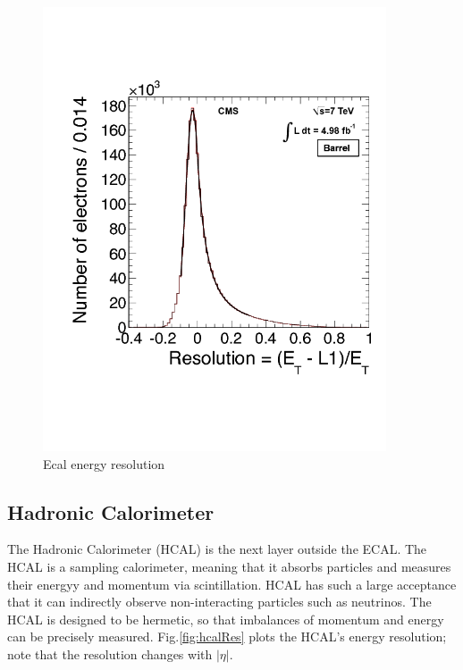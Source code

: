 \begin{figure}[h!]
\begin{centering}
\includegraphics[width=4in]{Chapter3/importfigs/figures_L1EGresolutionEB_cmsTriggerSys.png}
\par\end{centering}
\caption{Ecal energy resolution \label{fig:ecalResL1}}
\end{figure}
 
 
\subsection{Hadronic Calorimeter}


The Hadronic Calorimeter (HCAL) is the next layer outside the ECAL. The HCAL is a sampling calorimeter, meaning that it absorbs particles and measures their energyy and momentum via scintillation. HCAL has such a large acceptance that it can indirectly observe non-interacting particles such as neutrinos. The HCAL is designed to be hermetic, so that imbalances of momentum and energy can be precisely measured. Fig.\ref{fig:hcalRes} plots the HCAL's energy resolution; note that the resolution changes with $|\eta|$.

